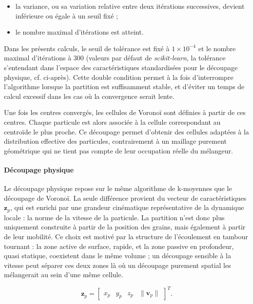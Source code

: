 \documentclass[french]{MemoireMaster}
\begin{document}
\begin{itemize}[itemsep=2pt]
  \item la variance, ou sa variation relative entre deux itérations successives, devient inférieure ou égale à un seuil fixé ;
  \item le nombre maximal d'itérations est atteint.
\end{itemize}

Dans les présents calculs, le seuil de tolérance est fixé à $1\times10^{-4}$ et le nombre maximal d'itérations à $300$ (valeurs par défaut de \textit{scikit-learn}, la tolérance s'entendant dans l'espace des caractéristiques standardisées pour le découpage physique, cf. ci-après). Cette double condition permet à la fois d'interrompre l'algorithme lorsque la partition est suffisamment stable, et d'éviter un temps de calcul excessif dans les cas où la convergence serait lente.

Une fois les centres convergés, les cellules de Voronoï sont définies à partir de ces centres. Chaque particule est alors associée à la cellule correspondant au centroïde le plus proche. Ce découpage permet d'obtenir des cellules adaptées à la distribution effective des particules, contrairement à un maillage purement géométrique qui ne tient pas compte de leur occupation réelle du mélangeur.

\paragraph{Découpage physique}
Le découpage physique repose sur le même algorithme de k-moyennes que le découpage de Voronoï. La seule différence provient du vecteur de caractéristiques $\mathbf{z}_p$, qui est enrichi par une grandeur cinématique représentative de la dynamique locale : la norme de la vitesse de la particule. La partition n'est donc plus uniquement construite à partir de la position des grains, mais également à partir de leur mobilité. Ce choix est motivé par la structure de l'écoulement en tambour tournant : la zone active de surface, rapide, et la zone passive en profondeur, quasi statique, coexistent dans le même volume ; un découpage sensible à la vitesse peut séparer ces deux zones là où un découpage purement spatial les mélangerait au sein d'une même cellule.

\begin{equation}
  \mathbf{z}_p
  =
  \begin{bmatrix}
    x_p & y_p & z_p & \|\mathbf{v}_p\|
  \end{bmatrix}^T.
  \label{eq:physics}
\end{equation}
\end{document}
